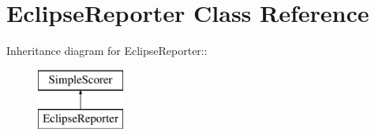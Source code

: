 \hypertarget{class_eclipse_reporter}{
\section{EclipseReporter Class Reference}
\label{class_eclipse_reporter}
}
Inheritance diagram for EclipseReporter::\begin{figure}[H]
\begin{center}
\leavevmode
\includegraphics[height=2cm]{class_eclipse_reporter}
\end{center}
\end{figure}
